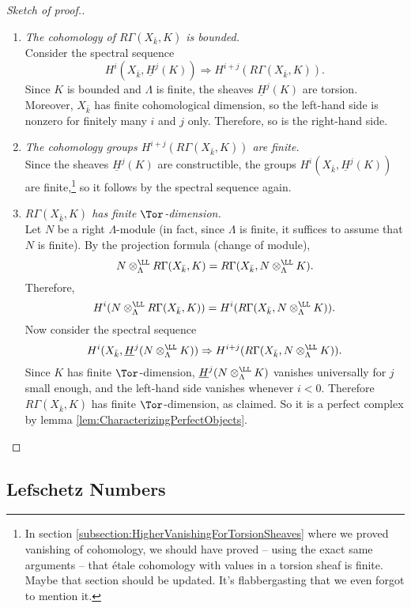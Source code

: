 \begin{proof}[Sketch of proof.] $ $
\begin{enumerate}[\it Step 1.]
\item
{\it The cohomology of $R\Gamma(X_{\bar k}, K)$ is bounded.}
\\
Consider the spectral sequence
$$
H^i(X_{\bar k}, \underline H^j(K)) \Rightarrow H^{i+j} (R\Gamma(X_{\bar k}, K)).
$$
Since $K$ is bounded and $\Lambda$ is finite, the sheaves $\underline H^j(K)$ are torsion. Moreover, $X_{\bar k}$ has finite cohomological dimension, so the left-hand side is nonzero for finitely many $i$ and $j$ only. Therefore, so is the right-hand side.
\item
{\it The cohomology groups $H^{i+j} (R\Gamma(X_{\bar k}, K))$ are finite.}
\\
Since the sheaves $\underline H^j(K)$ are constructible, the groups $H^i(X_{\bar k}, \underline H^j(K))$ are finite,\footnote{In section \ref{subsection:HigherVanishingForTorsionSheaves} where we proved vanishing of cohomology, we should have proved -- using the exact same arguments -- that \'etale cohomology with values in a torsion sheaf is finite. Maybe that section should be updated. It's flabbergasting that we even forgot to mention it.} so it follows by the spectral sequence again. 
\item
{\it $R\Gamma(X_{\bar k}, K)$ has finite $\Tor$-dimension.}
\\
Let $N$ be a right $\Lambda$-module (in fact, since $\Lambda$ is finite, it suffices to assume that $N$ is finite). By the projection formula (change of module), 
$$
N\otimes^\LL_\Lambda R \Gamma(X_{\bar k}, K) = R\Gamma(X_{\bar k}, N\otimes^\LL_\Lambda K).
$$
Therefore,
$$
H^i (N\otimes^\LL_\Lambda R\Gamma(X_{\bar k}, K)) = H^i(R\Gamma(X_{\bar k}, N \otimes_{\Lambda}^\LL K)).
$$
Now consider the spectral sequence
$$
H^i (X_{\bar k}, \underline H^j (N\otimes_{\Lambda}^\LL K))
\Rightarrow
H^{i+j}(R\Gamma(X_{\bar k}, N \otimes_{\Lambda}^\LL K)).
$$
Since $K$ has finite $\Tor$-dimension, $\underline H^j (N\otimes_{\Lambda}^\LL K)$ vanishes universally for $j$ small enough, and the left-hand side vanishes whenever $i < 0$. Therefore $R\Gamma(X_{\bar k}, K)$ has finite $\Tor$-dimension, as claimed. So it is a perfect complex by lemma \ref{lem:CharacterizingPerfectObjects}.
\end{enumerate}
\end{proof}

\subsection{Lefschetz Numbers}


